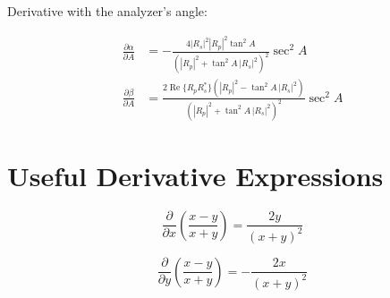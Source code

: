\documentclass{article}
\begin{document}
Derivative with the analyzer's angle:

\begin{align}
\frac{\partial \alpha}{\partial A} & = - \frac{4 |R_s|^2 |R_p|^2 \tan^2 A}{\left( |R_p|^2 + \tan^2 A \, |R_s|^2 \right)^2} \sec^2 A \\
\frac{\partial \beta}{\partial A} & = \frac{2 \operatorname{Re}\{R_p R_s^\ast\} \left(|R_p|^2 - \tan^2 A \, |R_s|^2\right)}{\left( |R_p|^2 + \tan^2 A \, |R_s|^2 \right)^2} \sec^2 A
\end{align}

\section{Useful Derivative Expressions}
\begin{equation*}
    \frac{\partial}{\partial x} \left( \frac{x-y}{x+y}\right) = \frac{2 y}{(x+y)^2}
\end{equation*}

\begin{equation*}
    \frac{\partial}{\partial y} \left( \frac{x-y}{x+y}\right) = - \frac{2 x}{(x+y)^2}
\end{equation*}
\end{document}

